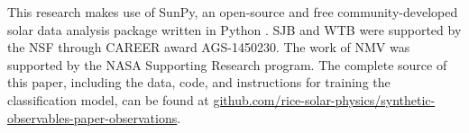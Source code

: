 \documentclass[modern,linenumbers,longauthor]{aastex63}
\begin{document}






\acknowledgments
This research makes use of SunPy, an open-source and free community-developed solar data analysis package written in Python \citep{sunpy_community_sunpypython_2015}. 
SJB and WTB were supported by the NSF through CAREER award AGS-1450230.
The work of NMV was supported by the NASA Supporting Research program.
The complete source of this paper, including the data, code, and instructions for training the classification model, can be found at \href{https://github.com/rice-solar-physics/synthetic-observables-paper-observations}{github.com/rice-solar-physics/synthetic-observables-paper-observations}.






\listofchanges
\end{document}
